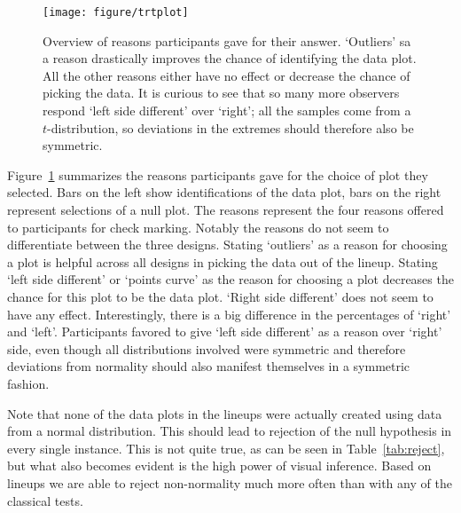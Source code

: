 \documentclass{article}\usepackage[]{graphicx}\usepackage[]{color}
\newenvironment{knitrout}{}{} %
\newcommand{\hh}[1]{{\color{magenta} #1}}
\newcommand{\hhnote}[1]{\todo[inline,color=magenta!40]{#1}}
\begin{document}
\begin{figure}[hbt]
\centering
\begin{knitrout}
\color{fgcolor}
\texttt{[image: figure/trtplot]} 

\end{knitrout}

\caption{\label{fig:choices}Overview of reasons participants gave for  their answer. `Outliers' sa a reason drastically improves the chance of identifying the data plot. All the other reasons either have no effect or decrease the chance of picking the data. It is curious to see that so many more observers respond `left side different' over `right';  all the samples  come from a  $t$-distribution, so deviations in the extremes should therefore also be symmetric.}
\end{figure}

\hh{Figure~\ref{fig:choices} summarizes the reasons participants gave for the choice of plot they selected. Bars on the left show  identifications of the data plot, bars on the right represent selections of a null plot. The reasons represent the four reasons offered  to participants for check marking. Notably the reasons do not seem to differentiate between the three designs. Stating `outliers' as a reason for choosing a plot is helpful across all designs in picking the data out of the lineup. Stating `left side different' or `points curve'  as the reason for choosing a plot decreases the chance for this plot to be the data plot. `Right side different' does not seem to have any effect. Interestingly, there is a big difference in the percentages of `right' and `left'. Participants favored to give `left side different' as a reason over `right' side, even though all distributions involved were symmetric and therefore deviations from normality should also manifest themselves in a symmetric fashion.}


Note that none of the data plots in the lineups were actually created using data from a normal distribution. This should lead to rejection of the null hypothesis in every single instance. This is not quite true, as can be seen in Table~\ref{tab:reject}, but what also becomes evident is the high power  of visual inference. Based on lineups we are able to reject non-normality much more often than with any of the classical tests.
\end{document}
